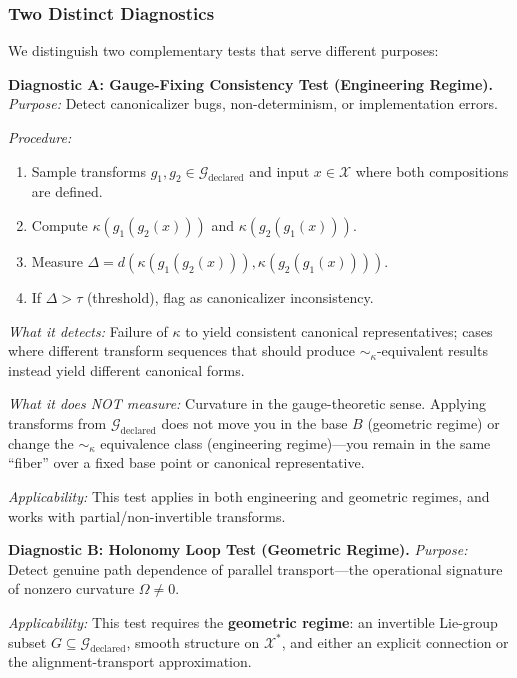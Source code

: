 \documentclass[12pt]{article}
\begin{document}
\subsubsection{Two Distinct Diagnostics}

We distinguish two complementary tests that serve different purposes:

\textbf{Diagnostic A: Gauge-Fixing Consistency Test (Engineering Regime).} \emph{Purpose:} Detect
canonicalizer bugs, non-determinism, or implementation errors.

\emph{Procedure:}
\begin{enumerate}
\item Sample transforms $g_1, g_2 \in \mathcal{G}_{\text{declared}}$ and input $x \in \mathcal{X}$ where both compositions are defined.
\item Compute $\kappa(g_1(g_2(x)))$ and $\kappa(g_2(g_1(x)))$.
\item Measure $\Delta = d(\kappa(g_1(g_2(x))), \kappa(g_2(g_1(x))))$.
\item If $\Delta > \tau$ (threshold), flag as canonicalizer inconsistency.
\end{enumerate}

\emph{What it detects:} Failure of $\kappa$ to yield consistent canonical representatives; cases where different
transform sequences that should produce $\sim_\kappa$-equivalent results instead yield different canonical
forms.

\emph{What it does NOT measure:} Curvature in the gauge-theoretic sense. Applying transforms
from $\mathcal{G}_{\text{declared}}$ does not move you in the base $B$ (geometric regime) or change the $\sim_\kappa$ equivalence
class (engineering regime)---you remain in the same ``fiber'' over a fixed base point or canonical
representative.

\emph{Applicability:} This test applies in both engineering and geometric regimes, and works with
partial/non-invertible transforms.

\medskip

\textbf{Diagnostic B: Holonomy Loop Test (Geometric Regime).} \emph{Purpose:} Detect genuine path
dependence of parallel transport---the operational signature of nonzero curvature $\Omega \neq 0$.

\emph{Applicability:} This test requires the \textbf{geometric regime}: an invertible Lie-group subset $G \subseteq
\mathcal{G}_{\text{declared}}$, smooth structure on $\mathcal{X}^*$, and either an explicit connection or the alignment-transport
approximation.
\end{document}
